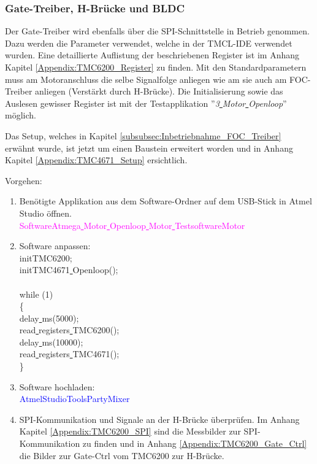\subsubsection{Gate-Treiber, H-Brücke und BLDC}
\label{subsubsec:Inbetriebnahme_Gate_Treiber}

Der Gate-Treiber wird ebenfalls über die SPI-Schnittstelle in Betrieb genommen. Dazu werden die Parameter verwendet, welche in der TMCL-IDE verwendet wurden. Eine detaillierte Auflistung der beschriebenen Register ist im Anhang Kapitel \ref{Appendix:TMC6200_Register} zu finden. Mit den Standardparametern muss am Motoranschluss die selbe Signalfolge anliegen wie am sie auch am FOC-Treiber anliegen (Verstärkt durch H-Brücke). Die Initialisierung sowie das Auslesen gewisser Register ist mit der Testapplikation ''\textit{3\underline{ }Motor\underline{ }Openloop}'' möglich.

Das Setup, welches in Kapitel \ref{subsubsec:Inbetriebnahme_FOC_Treiber} erwähnt wurde, ist jetzt um einen Baustein erweitert worden und in Anhang Kapitel \ref{Appendix:TMC4671_Setup} ersichtlich.

Vorgehen:
\begin{enumerate}
\item Benötigte Applikation aus dem Software-Ordner auf dem USB-Stick in Atmel Studio öffnen.\\
\textcolor{magenta}{Software\textrightarrow Atmega\underline{ }Motor\underline{ }Openloop\underline{ }Motor\underline{ }Testsoftware\textrightarrow Motor}\\


\item Software anpassen:\\
\textcolor{OliveGreen}{
	initTMC6200;\\
	initTMC4671\underline{ }Openloop();\\
\\
    while (1) \\
    \{\\
		\underline{ }delay\underline{ }ms(5000);\\
		read\underline{ }registers\underline{ }TMC6200();\\
		\underline{ }delay\underline{ }ms(10000);\\
		read\underline{ }registers\underline{ }TMC4671();\\
    \}
}\newline
\item Software hochladen:\\
\textcolor{blue}{AtmelStudio\textrightarrow Tools\textrightarrow PartyMixer}\\

\item SPI-Kommunikation und Signale an der H-Brücke überprüfen. Im Anhang Kapitel \ref{Appendix:TMC6200_SPI} sind die Messbilder zur SPI-Kommunikation zu finden und in Anhang \ref{Appendix:TMC6200_Gate_Ctrl} die Bilder zur Gate-Ctrl vom TMC6200 zur H-Brücke.

\end{enumerate}

